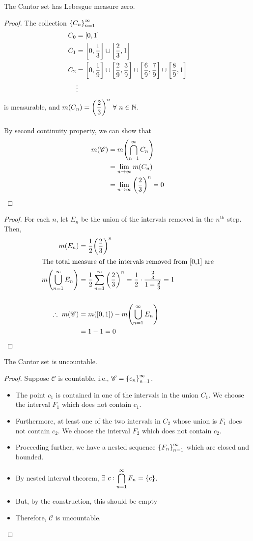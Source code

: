 \documentclass[a4paper]{book}
\begin{document}
\begin{theorem}
The Cantor set has Lebesgue measure zero.
\begin{proof}
The collection $\qty{C_n}_{n=1}^\infty$ 
\begin{align*}
C_0 &= [0,1] \\
C_1 &= \qty[0,\frac13] \cup \qty[\frac23, 1] \\
C_2 &= \qty[0,\frac19] \cup \qty[\frac29, \frac39] \cup \qty[\frac69, \frac79] \cup \qty[\frac89, 1] \\
&\vdots
\end{align*}
is measurable, and $m(C_n) = \qty(\dfrac{2}{3})^n\ \forall\ n\in \mathbb{N}$. \\\\
By second continuity property, we can show that
\begin{align*}
m(\mathscr{C}) &= m \qty(\bigcap_{n=1}^\infty C_n)\\
              &= \lim_{n \to \infty} m(C_n) \\
              &= \lim_{n \to \infty} \qty(\dfrac{2}{3})^n = 0
\end{align*}
\end{proof}
\begin{proof}
For each $n$, let $E_n$ be the union of the intervals removed in the $n^\mathrm{th}$ step. Then,
\begin{align*}
m(E_n) &= \dfrac{1}{2} \qty(\dfrac{2}{3})^n \\
\intertext{The total measure of the intervals removed from [0,1] are}
m\qty(\bigcup_{n=1}^\infty E_n) &=  \dfrac{1}{2} \sum_{n=1}^\infty \qty(\dfrac{2}{3})^n = \dfrac12 \cdot \dfrac{\frac23}{1 - \frac23} = 1 \\\\
\therefore\ m(\mathscr{C}) &= m([0,1]) - m\qty(\bigcup_{n=1}^\infty E_n) \\
&= 1 - 1 = 0
\end{align*}
\end{proof}
\end{theorem}
\begin{theorem}
The Cantor set is uncountable.
\begin{proof}
Suppose $\mathscr{C}$ is countable, i.e., $\mathscr{C} = \qty{c_n}_{n=1}^\infty$. 
\begin{itemize}
\item The point $c_1$ is contained in one of the intervals in the union $C_1$. We choose the interval $F_1$ which does not contain $c_1$.
\item Furthermore, at least one of the two intervals in $C_2$ whose union is $F_1$ does not contain $c_2$. We choose the interval $F_2$ which does not contain $c_2$.
\item Proceeding further, we have a nested sequence $\qty{F_n}_{n=1}^\infty$ which are closed and bounded.
\item By nested interval theorem, $\displaystyle \exists\ c : \bigcap_{n=1}^\infty F_n = \qty{c}$. 
\item But, by the construction, this should be empty 
\item Therefore, $\mathscr{C}$ is uncountable.
\end{itemize}
\end{proof}
\end{theorem}
\end{document}
